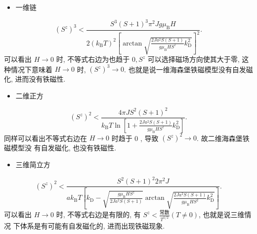 \begin{itemize}
\item 一维链
\end{itemize}
\begin{equation}
\left(S^{z}\right)^{3}<\frac{S^{3}(S+1)^{3} \pi^{2} J g \mu_{\mathrm{B}} H}{2\left(k_{\mathrm{B}} T\right)^{2}\left[\arctan \sqrt{\frac{2 J a^{2} S(S+1) }{g \mu_{\mathrm{B}} H S^{z}}k_{\mathrm{D}}^{2}}\right]^{2}}.
\end{equation}
可以看出 $H \rightarrow 0$ 时, 不等式右边为也趋于 $0, S^{z}$ 可以选择磁场方向使其大于零, 这种情况下意味着 $H \rightarrow 0$ 时, $\left(S^{z}\right)^{3} \rightarrow 0$. 也就是说一维海森堡铁磁模型没有自发磁化, 进而没有铁磁性.

\begin{itemize}
\item 二维正方
\end{itemize}
\begin{equation}
\left(S^{z}\right)^{2}<\frac{4 \pi J S^{2}(S+1)^{2}}{k_{\mathrm{B}} T \ln \left[1+\frac{2 J a^{2} S(S+1)}{g \mu_{\mathrm{B}} H S^{z}} k^2_{\mathrm{D}}\right]} .
\end{equation}
同样可以看出不等式右边在 $H \rightarrow 0$ 时趋于 0 , 导致 $\left(S^{z}\right)^{2} \rightarrow 0$. 故二维海森堡铁磁模型没 有自发磁化, 也没有铁磁性.

\begin{itemize}
\item 三维简立方
\end{itemize}
\begin{equation}
\left(S^{z}\right)^{2}<\frac{S^{2}(S+1)^{2} 2 \pi^{2} J}{a k_{\mathrm{B}} T\left[k_{\mathrm{D}}-\sqrt{\frac{g \mu_{\mathrm{B}} H S^{z}}{2 J a^{2} S(S+1)}} \arctan \sqrt{\frac{2J a^{2} S(S+1) }{g \mu_{\mathrm{B}} H S^{2}}k_{\mathrm{D}}^{2}}\right]} .
\end{equation}
可以看出 $H \rightarrow 0$ 时, 不等式右边是有限的, 有 $S^{z}<\frac{\text {常数}}{T^{1 / 2}}(T \neq 0)$, 也就是说三维情况 下体系是有可能有自发磁化的, 进而出现铁磁现象.

